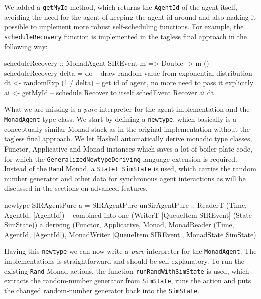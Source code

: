 We added a \texttt{getMyId} method, which returns the \texttt{AgentId} of the agent itself, avoiding the need for the agent of keeping the agent id around and also making it possible to implement more robust self-scheduling functions. For example, the \texttt{scheduleRecovery} function is implemented in the tagless final approach in the following way:

\begin{HaskellCode}
scheduleRecovery :: MonadAgent SIREvent m => Double -> m ()
scheduleRecovery delta = do
  -- draw random value from exponential distribution
  dt <- randomExp (1 / delta)
  -- get id of agent, no more need to pass it explicitly
  ai <- getMyId
  -- schedule Recover to itself
  schedEvent Recover ai dt
\end{HaskellCode}

What we are missing is a \textit{pure} interpreter for the agent implementation and the \texttt{MonadAgent} type class. We start by defining a \texttt{newtype}, which basically is a conceptually similar Monad stack as in the original implementation without the tagless final approach. We let Haskell automatically derive monadic type classes, Functor, Applicative and Monad instances which saves a lot of boiler plate code, for which the \texttt{GeneralizedNewtypeDeriving} language extension is required. Instead of the \texttt{Rand} Monad, a \texttt{StateT SimState} is used, which carries the random number generator and other data for synchronous agent interactions as will be discussed in the sections on advanced features.

\begin{HaskellCode}
newtype SIRAgentPure a = SIRAgentPure 
  { unSirAgentPure :: ReaderT (Time, AgentId, [AgentId]) -- combined into one
                        (WriterT [QueueItem SIREvent]
                          (State SimState)) a}
  deriving (Functor, Applicative, Monad, 
            MonadReader (Time, AgentId, [AgentId]),
            MonadWriter [QueueItem SIREvent],  
            MonadState SimState)
\end{HaskellCode}

Having this \texttt{newtype} we can now write a \textit{pure} interpreter for the \texttt{MonadAgent}. The implementations is straightforward and should be self-explanatory. To run the existing \texttt{Rand} Monad actions, the function \texttt{runRandWithSimState} is used, which extracts the random-number generator from \texttt{SimState}, runs the action and puts the changed random-number generator back into the \texttt{SimState}.

